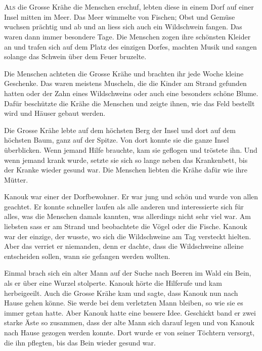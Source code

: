 \chapter*{}
\lettrine[lines=3]{\color{red}A}{ls} die Grosse Krähe die Menschen erschuf, lebten diese in einem Dorf auf einer Insel mitten im Meer. Das Meer wimmelte von Fischen; Obst und Gemüse wuchsen prächtig und ab und an liess sich auch ein Wildschwein fangen. Das waren dann immer besondere Tage. Die Menschen zogen ihre schönsten Kleider an und trafen sich auf dem Platz des einzigen Dorfes, machten Musik und sangen solange das Schwein über dem Feuer bruzelte.

Die Menschen achteten die Grosse Krähe und brachten ihr jede Woche kleine Geschenke. Das waren meistens Muscheln, die die Kinder am Strand gefunden hatten oder der Zahn eines Wildschweins oder auch eine besonders schöne Blume. Dafür beschützte die Krähe die Menschen und zeigte ihnen, wie das Feld bestellt wird und Häuser gebaut werden.

Die Grosse Krähe lebte auf dem höchsten Berg der Insel und dort auf dem höchsten Baum, ganz auf der Spitze. Von dort konnte sie die ganze Insel überblicken. Wenn jemand Hilfe brauchte, kam sie geflogen und tröstete ihn. Und wenn jemand krank wurde, setzte sie sich so lange neben das Krankenbett, bis der Kranke wieder gesund war. Die Menschen liebten die Krähe dafür wie ihre Mütter.

Kanouk war einer der Dorfbewohner. Er war jung und schön und wurde von allen geachtet. Er konnte schneller laufen als alle anderen und interessierte sich für alles, was die Menschen damals kannten, was allerdings nicht sehr viel war. Am liebsten sass er am Strand und beobachtete die Vögel oder die Fische. Kanouk war der einzige, der wusste, wo sich die Wildschweine am Tag versteckt hielten. Aber das verriet er niemanden, denn er dachte, dass die Wildschweine alleine entscheiden sollen, wann sie gefangen werden wollten.

Einmal brach sich ein alter Mann auf der Suche nach Beeren im Wald ein Bein, als er über eine Wurzel stolperte. Kanouk hörte die Hilferufe und kam herbeigeeilt. Auch die Grosse Krähe kam und sagte, dass Kanouk nun nach Hause gehen könne. Sie werde bei dem verletzten Mann bleiben, so wie sie es immer getan hatte. Aber Kanouk hatte eine bessere Idee. Geschickt band er zwei starke Äste so zusammen, dass der alte Mann sich darauf legen und von Kanouk nach Hause gezogen werden konnte. Dort wurde er von seiner Töchtern versorgt, die ihn pflegten, bis das Bein wieder gesund war.

